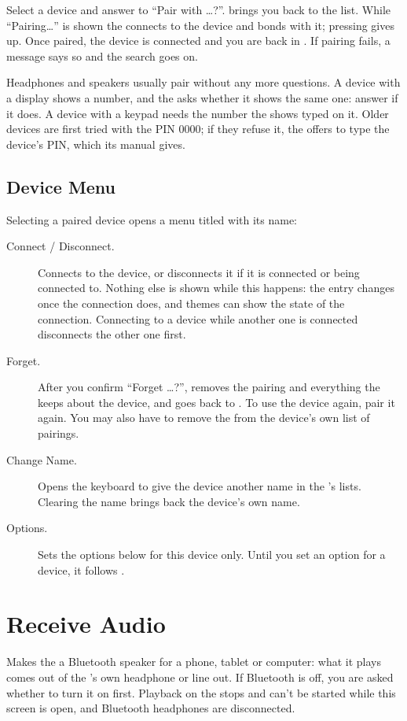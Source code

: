 Select a device and answer  to ``Pair with \ldots?''.
 brings you back to the list. While ``Pairing\ldots'' is shown
the \dap{} connects to the device and bonds with it; pressing
\ActionStdCancel{} gives up. Once paired, the device is connected and you
are back in . If pairing fails, a message says so and the
search goes on.

Headphones and speakers usually pair without any more questions. A device
with a display shows a number, and the \dap{} asks whether it shows the
same one: answer  if it does. A device with a keypad needs the
number the \dap{} shows typed on it. Older devices are first tried with the
PIN 0000; if they refuse it, the \dap{} offers to type the device's PIN,
which its manual gives.

\subsection{Device Menu}
Selecting a paired device opens a menu titled with its name:

\begin{description}
  \item[Connect / Disconnect.] Connects to the device, or disconnects it
    if it is connected or being connected to. Nothing else is shown while
    this happens: the entry changes once the connection does, and themes
    can show the state of the connection. Connecting to a device while
    another one is connected disconnects the other one first.
  \item[Forget.] After you confirm ``Forget \ldots?'', removes the pairing
    and everything the \dap{} keeps about the device, and goes back to
    . To use the device again, pair it again. You may also
    have to remove the \dap{} from the device's own list of pairings.
  \item[Change Name.] Opens the keyboard to give the device another name
    in the \dap{}'s lists. Clearing the name brings back the device's own
    name.
  \item[Options.] Sets the options below for this device only. Until you
    set an option for a device, it follows
    .
\end{description}

\section{Receive Audio}
Makes the \dap{} a Bluetooth speaker for a phone, tablet or computer: what
it plays comes out of the \dap{}'s own headphone or line out. If Bluetooth
is off, you are asked whether to turn it on first. Playback on the \dap{}
stops and can't be started while this screen is open, and Bluetooth
headphones are disconnected.

